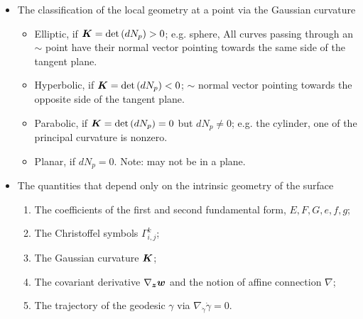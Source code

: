\documentclass[11pt]{article}
\begin{document}
\begin{itemize}
\item The classification of the local geometry at a point via the Gaussian curvature
\begin{itemize}
\item Elliptic, if $\boldsymbol{K}= \det\left(dN_{p}\right) >0$; e.g. sphere, All curves passing through an $\sim$ point have their normal vector pointing towards the same side of the tangent plane.

\item Hyperbolic, if $\boldsymbol{K}=\det\left(dN_{p}\right) <0$; $\sim $ normal vector pointing towards the opposite side of the tangent plane.

\item Parabolic, if  $\boldsymbol{K}=\det\left(dN_{p}\right) =0$ but $dN_{p}\neq 0$; e.g. the cylinder, one of the principal curvature is nonzero. 

\item Planar, if $dN_{p} = 0$. Note: may not be in a plane.   
\end{itemize}\vspace{15pt}


\item The quantities that depend only on the intrinsic geometry of the surface
\begin{enumerate}
\item The coefficients of the first and second fundamental form, $E,F,G, e,f,g$;
\item The Christoffel symbols $\Gamma_{i,j}^{k}$;
\item The Gaussian curvature $\boldsymbol{K}$;
\item The covariant derivative $\nabla_{\boldsymbol{z}}\boldsymbol{w}$ and the notion of affine connection $\nabla$;
\item The trajectory of the geodesic $\gamma$ via $\nabla_{\dot{\gamma}}\dot{\gamma} = 0$.
\end{enumerate}
\end{itemize}
\end{document}
